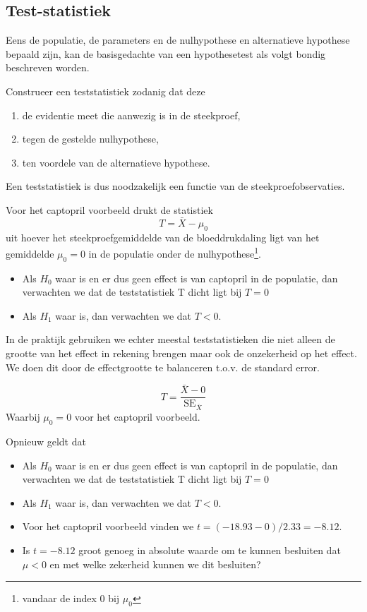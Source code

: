 \documentclass[
  12pt,dutch,coursenotes]{book}
\providecommand{\tightlist}{%
  \setlength{\itemsep}{0pt}\setlength{\parskip}{0pt}}
\theoremstyle{definition}
\theoremstyle{definition}
\theoremstyle{definition}
\theoremstyle{remark}
\begin{document}
\hypertarget{test-statistiek}{%
\subsection{Test-statistiek}\label{test-statistiek}}

Eens de populatie, de parameters en de nulhypothese en alternatieve hypothese bepaald zijn, kan de basisgedachte van een hypothesetest als volgt bondig beschreven worden.

Construeer een teststatistiek zodanig dat deze

\begin{enumerate}
\def\labelenumi{\arabic{enumi}.}
\tightlist
\item
  de evidentie meet die aanwezig is in de steekproef,
\item
  tegen de gestelde nulhypothese,
\item
  ten voordele van de alternatieve hypothese.
\end{enumerate}

Een teststatistiek is dus noodzakelijk een functie van de steekproefobservaties.

Voor het captopril voorbeeld drukt de statistiek
\[T=\bar X - \mu_0\]
uit hoever het steekproefgemiddelde van de bloeddrukdaling ligt van het gemiddelde \(\mu_0=0\) in de populatie onder de nulhypothese\footnote{vandaar de index 0 bij \(\mu_0\)}.

\begin{itemize}
\tightlist
\item
  Als \(H_0\) waar is en er dus geen effect is van captopril in de populatie, dan verwachten we dat de teststatistiek T dicht ligt bij \(T=0\)
\item
  Als \(H_1\) waar is, dan verwachten we dat \(T<0\).
\end{itemize}

In de praktijk gebruiken we echter meestal teststatistieken die niet alleen de grootte van het effect in rekening brengen maar ook de onzekerheid op het effect.
We doen dit door de effectgrootte te balanceren t.o.v. de standard error.

\[T=\frac{\bar{X}-0}{\text{SE}_{\bar X}}\]
Waarbij \(\mu_0=0\) voor het captopril voorbeeld.

Opnieuw geldt dat

\begin{itemize}
\tightlist
\item
  Als \(H_0\) waar is en er dus geen effect is van captopril in de populatie, dan verwachten we dat de teststatistiek T dicht ligt bij \(T=0\)
\item
  Als \(H_1\) waar is, dan verwachten we dat \(T<0\).
\item
  Voor het captopril voorbeeld vinden we \(t=(-18.93-0)/2.33=-8.12\).
\item
  Is \(t = -8.12\) groot genoeg in absolute waarde om te kunnen besluiten dat \(\mu < 0\) en met welke zekerheid kunnen we dit besluiten?
\end{itemize}
\end{document}
